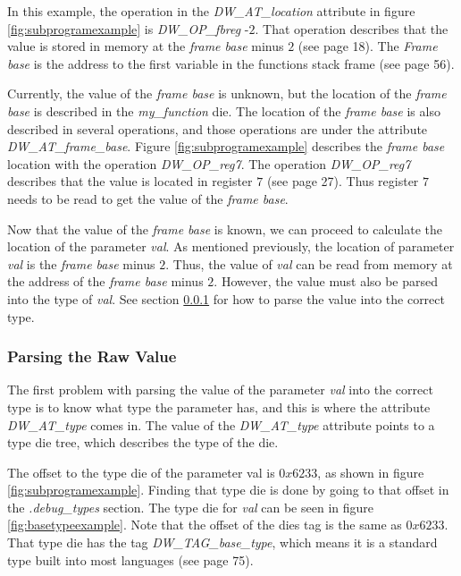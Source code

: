 In this example, the operation in the \emph{DW\_AT\_location} attribute in figure \ref{fig:subprogramexample} is \emph{DW\_OP\_fbreg} -$2$.
That operation describes that the value is stored in memory at the \emph{frame base} minus $2$ (see \cite{dwarf} page 18).
The \emph{Frame base} is the address to the first variable in the functions stack frame (see \cite{dwarf} page 56).


Currently, the value of the \emph{frame base} is unknown, but the location of the \emph{frame base} is described in the \emph{my\_function} \gls{die}.
The location of the \emph{frame base} is also described in several operations, and those operations are under the attribute \emph{DW\_AT\_frame\_base}.
Figure \ref{fig:subprogramexample} describes the \emph{frame base} location with the operation \emph{DW\_OP\_reg7}.
The operation \emph{DW\_OP\_reg7} describes that the value is located in register $7$ (see \cite{dwarf} page 27).
Thus register $7$ needs to be read to get the value of the \emph{frame base}.


Now that the value of the \emph{frame base} is known, we can proceed to calculate the location of the parameter \emph{val}.
As mentioned previously, the location of parameter \emph{val} is the \emph{frame base} minus $2$.
Thus, the value of \emph{val} can be read from memory at the address of the \emph{frame base} minus $2$.
However, the value must also be parsed into the type of \emph{val}.
See section \ref{sec:parsingvalue} for how to parse the value into the correct type.


\subsubsection{Parsing the Raw Value} \label{sec:parsingvalue}
The first problem with parsing the value of the parameter \emph{val} into the correct type is to know what type the parameter has, and this is where the attribute \emph{DW\_AT\_type} comes in.
The value of the \emph{DW\_AT\_type} attribute points to a type \gls{die} tree, which describes the type of the \gls{die}.


The offset to the type \gls{die} of the parameter val is $0x6233$, as shown in figure \ref{fig:subprogramexample}.
Finding that type \gls{die} is done by going to that offset in the \emph{.debug\_types} section.
  The type \gls{die} for \emph{val} can be seen in figure \ref{fig:basetypeexample}.
  Note that the offset of the \glspl{die} tag is the same as $0x6233$.
  That type \gls{die} has the tag \emph{DW\_TAG\_base\_type}, which means it is a standard type built into most languages (see \cite{dwarf} page 75).


